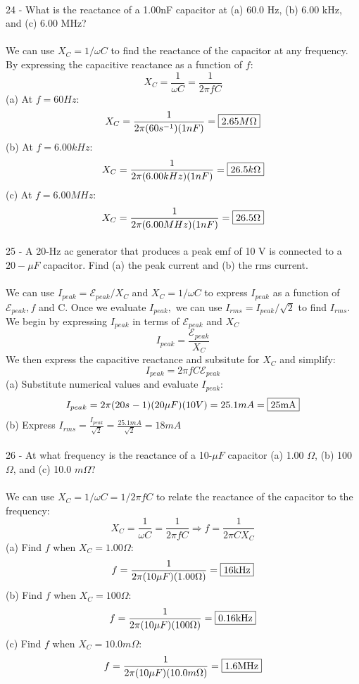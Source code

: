 \documentclass{report}
\begin{document}
\paragraph{}
24 - What is the reactance of a 1.00nF capacitor at (a) 60.0 Hz, (b) 6.00 kHz, and (c) 6.00 MHz?\\
\\
We can use $X_C = 1 / \omega C$ to find the reactance of the capacitor at any frequency. By expressing the capacitive reactance as a function of $f:$
$$X_C = \frac{1}{\omega C} = \frac{1}{2\pi fC}$$
(a) At $f = 60 Hz$:
$$X_C = \frac{1}{2\pi(60s^{-1})(1nF)} = \fbox{$2.65M\Omega$}$$
(b) At $f = 6.00 kHz$:
$$X_C = \frac{1}{2\pi(6.00kHz)(1nF)} = \fbox{$26.5k\Omega$}$$
(c) At $f = 6.00 MHz$:
$$X_C = \frac{1}{2\pi(6.00MHz)(1nF)} = \fbox{$26.5\Omega$}$$

\paragraph{}
 25 - A 20-Hz ac generator that produces a peak emf of 10 V is connected to a $20-\mu F$ capacitor. Find (a) the peak current and (b) the rms current.\\
\\
We can use $I_{peak} = \mathcal{E}_{peak} / X_C$ and $X_C = 1 / \omega C$ to express $I_{peak}$ as a function of $\mathcal{E}_{peak}, f$ and C. Once we evaluate $I_{peak},$ we can use $I_{rms} = I_{peak} / \sqrt{2}$ to find $I_{rms}$.\\
We begin by expressing $I_{peak}$ in terms of $\mathcal{E}_{peak}$ and $X_C$$$I_{peak} = \frac{\mathcal{E}_{peak}}{X_C}$$
We then express the capacitive reactance and subsitute for $X_C$ and simplify:
$$I_{peak} = 2\pi fC\mathcal{E}_{peak}$$
(a) Substitute numerical values and evaluate $I_{peak}:$
$$I_{peak} = 2\pi(20s^{}-1)(20\mu F)(10V) = 25.1mA = \fbox{25mA}$$
(b) Express $I_{rms} = \frac{I_{peak}}{\sqrt{2}} = \frac{25.1mA}{\sqrt{2}} = 18mA$

\paragraph{}
26 - At what frequency is the reactance of a 10-$\mu F$ capacitor (a) 1.00 $\Omega$, (b) 100 $\Omega$, and (c) 10.0 $m\Omega$?\\
\\
We can use $X_C = 1 / \omega C = 1 / 2\pi fC$ to relate the reactance of the capacitor to the frequency:
$$X_C = \frac{1}{\omega C} = \frac{1}{2\pi fC} \Rightarrow f = \frac{1}{2\pi CX_C}$$
(a) Find $f$ when $X_C = 1.00 \Omega$:
$$f = \frac{1}{2\pi(10\mu F)(1.00\Omega)} = \fbox{16kHz}$$
(b) Find $f$ when $X_C = 100 \Omega$:
$$f = \frac{1}{2\pi(10\mu F)(100\Omega)} = \fbox{0.16kHz}$$
(c) Find $f$ when $X_C = 10.0m \Omega$:
$$f = \frac{1}{2\pi(10\mu F)(10.0m \Omega)} = \fbox{1.6MHz}$$
\end{document}

